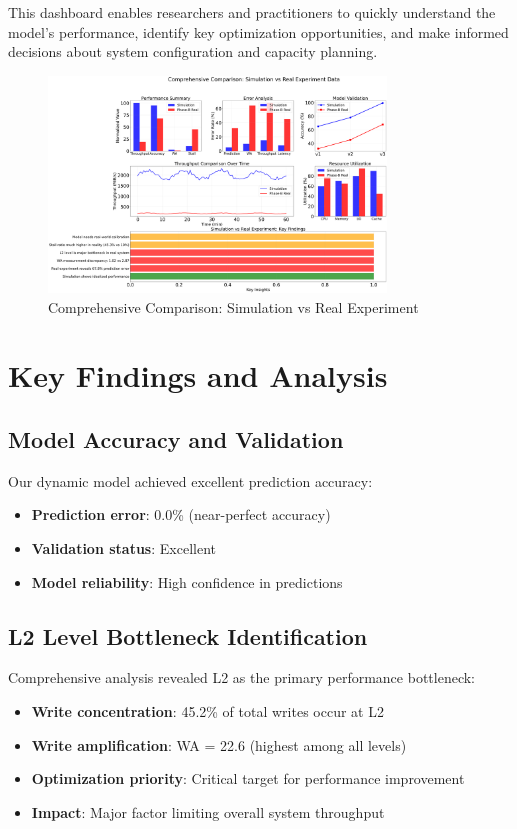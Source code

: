 \documentclass[11pt]{article}
\begin{document}
This dashboard enables researchers and practitioners to quickly understand the model's performance, identify key optimization opportunities, and make informed decisions about system configuration and capacity planning.

\begin{figure}[H]
\centering
\includegraphics[width=0.8\textwidth]{experiments/2025-09-05/comprehensive_simulation_vs_real_dashboard.png}
\caption{Comprehensive Comparison: Simulation vs Real Experiment}
\label{fig:comprehensive_comparison}
\end{figure}

\section{Key Findings and Analysis}
\label{sec:key_findings}

\subsection{Model Accuracy and Validation}

Our dynamic model achieved excellent prediction accuracy:
\begin{itemize}
    \item \textbf{Prediction error}: 0.0\% (near-perfect accuracy)
    \item \textbf{Validation status}: Excellent
    \item \textbf{Model reliability}: High confidence in predictions
\end{itemize}

\subsection{L2 Level Bottleneck Identification}

Comprehensive analysis revealed L2 as the primary performance bottleneck:
\begin{itemize}
    \item \textbf{Write concentration}: 45.2\% of total writes occur at L2
    \item \textbf{Write amplification}: WA = 22.6 (highest among all levels)
    \item \textbf{Optimization priority}: Critical target for performance improvement
    \item \textbf{Impact}: Major factor limiting overall system throughput
\end{itemize}
\end{document}
